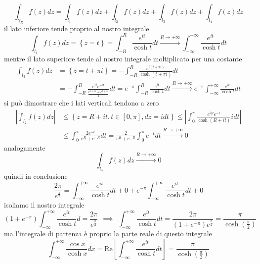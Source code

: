 \begin{equation*}
\int _{\gamma _{R}} f\left( z\right) dz=\int _{l_{1}} f\left( z\right) dz+\int _{l_{2}} f\left( z\right) dz+\int _{l_{3}} f\left( z\right) dz+\int _{l_{4}} f\left( z\right) dz
\end{equation*}
il lato inferiore tende proprio al nostro integrale
\begin{equation*}
\int _{l_{1}} f\left( z\right) dz=\left\{z=t\right\} =\int ^{R}_{-R}\frac{e^{it}}{\cosh t} dt\xrightarrow{R\rightarrow +\infty }\int ^{+\infty }_{-\infty }\frac{e^{it}}{\cosh t} dt
\end{equation*}
mentre il lato superiore tende al nostro integrale moltiplicato per una costante
\begin{align*}
\int _{l_{3}} f\left( z\right) dz & =\left\{z=t+\pi i\right\} =-\int ^{R}_{-R}\frac{e^{i\left( t+\pi i\right)}}{\cosh\left( t+\pi i\right)} dt\\
 & =-\int ^{R}_{-R}\frac{e^{it} e^{-\pi }}{\frac{e^{t+\pi i} +e^{t+\pi i}}{2}} dt=e^{-\pi }\int ^{R}_{-R}\frac{e^{it}}{\cosh t} dt\xrightarrow{R\rightarrow +\infty } e^{-\pi }\int ^{+\infty }_{-\infty }\frac{e^{it}}{\cosh t} dt
\end{align*}
si può dimostrare che i lati verticali tendono a zero
\begin{align*}
\left| \int _{l_{2}} f\left( z\right) dz\right|  & \leqslant \left\{z=R+it,t\in \left[ 0,\pi \right] ,dz=idt\right\} \leqslant \left| \int ^{\pi }_{0}\frac{e^{iR} e^{-t}}{\cosh\left( R+it\right)} idt\right| \\
 & \leqslant \int ^{\pi }_{0}\frac{2e^{-t}}{e^{R} +e^{-R}} dt=\frac{2}{e^{R} +e^{-R}}\int ^{\pi }_{0} e^{-t} dt\xrightarrow{R\rightarrow +\infty } 0
\end{align*}
analogamente
\begin{equation*}
\int _{l_{4}} f\left( z\right) dz\xrightarrow{R\rightarrow +\infty } 0
\end{equation*}
quindi in conclusione
\begin{equation*}
\frac{2\pi }{e^{\frac{\pi }{2}}} =\int ^{+\infty }_{-\infty }\frac{e^{it}}{\cosh t} dt+0+e^{-\pi }\int ^{+\infty }_{-\infty }\frac{e^{it}}{\cosh t} dt+0
\end{equation*}
isoliamo il nostro integrale
\begin{equation*}
\left( 1+e^{-\pi }\right)\int ^{+\infty }_{-\infty }\frac{e^{it}}{\cosh t} d=\frac{2\pi }{e^{\frac{\pi }{2}}} \ \ \implies \ \ \int ^{+\infty }_{-\infty }\frac{e^{it}}{\cosh t} dt=\frac{2\pi }{\left( 1+e^{-\pi }\right) e^{\frac{\pi }{2}}} =\frac{\pi }{\cosh\left(\frac{\pi }{2}\right)}
\end{equation*}
ma l'integrale di partenza è proprio la parte reale di questo integrale
\begin{equation*}
\int ^{+\infty }_{-\infty }\frac{\cos x}{\cosh x} dx=\mathrm{Re}\left[\int ^{+\infty }_{-\infty }\frac{e^{it}}{\cosh t} dt\right] =\frac{\pi }{\cosh\left(\frac{\pi }{2}\right)}
\end{equation*}
